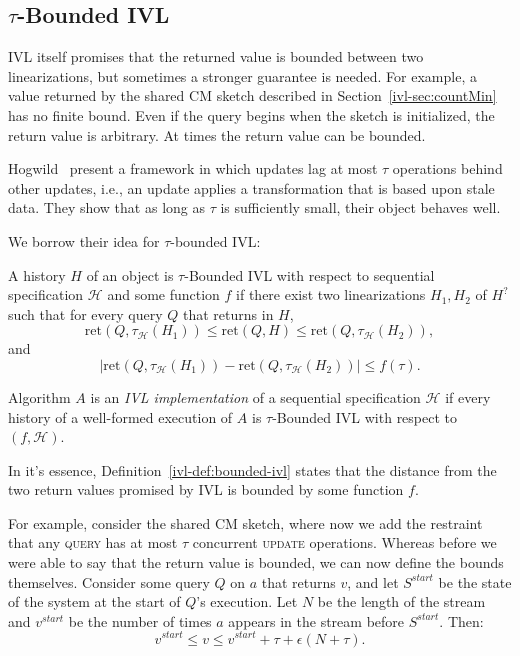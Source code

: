 \subsection{\texorpdfstring{$\tau$}{t}-Bounded IVL}
\label{ivl-ssec:bounded-ivl}

IVL itself promises that the returned value is bounded between two linearizations, but sometimes
a stronger guarantee is needed. For example, a value returned by the shared CM sketch
described in Section~\ref{ivl-sec:countMin} has no finite bound. Even if the query begins when the sketch
is initialized, the return value is arbitrary. At times the return value can be bounded.

Hogwild~ present a framework in which updates lag at most $\tau$ operations behind
other updates, i.e., an update applies a transformation that is based upon stale data. They show that
as long as $\tau$ is sufficiently small, their object behaves well.

We borrow their idea for $\tau$-bounded IVL:
\begin{definition}
    A history $H$ of an object is $\tau$-Bounded IVL with respect to sequential specification $\mathcal{H}$ and
    some function $f$ if there exist two linearizations $H_1, H_2$ of $H^?$ such that for every {\sc query} $Q$
    that returns in $H$,
    \[\text{ret}(Q, \tau_\mathcal{H}(H_1)) \leq \text{ret}(Q, H) \leq \text{ret}(Q, \tau_\mathcal{H}(H_2)), \]
    and
    \[\mid \text{ret}(Q, \tau_\mathcal{H}(H_1)) - \text{ret}(Q, \tau_\mathcal{H}(H_2)) \mid \leq f(\tau). \]
  
    Algorithm $A$ is an \emph{IVL implementation} of a sequential specification $\mathcal{H}$ if every
    history of a well-formed execution of $A$ is $\tau$-Bounded IVL with respect to $(f,\mathcal{H})$.
    \label{ivl-def:bounded-ivl}
\end{definition}

In it's essence, Definition~\ref{ivl-def:bounded-ivl} states that the distance from the two return values
promised by IVL is bounded by some function $f$.

For example, consider the shared CM sketch, where now we add the restraint that any \textsc{query} has at most $\tau$
concurrent \textsc{update} operations. Whereas before we were able to say that the return value is bounded, we can
now define the bounds themselves. Consider some query $Q$ on $a$ that returns $v$, and let $S^{start}$ be the
state of the system at the start of $Q$'s execution. Let $N$ be the length of the stream and $v^{start}$ be the number of
times $a$ appears in the stream before $S^{start}$. Then:
\[ v^{start} \leq v \leq v^{start} + \tau + \epsilon (N + \tau).\]